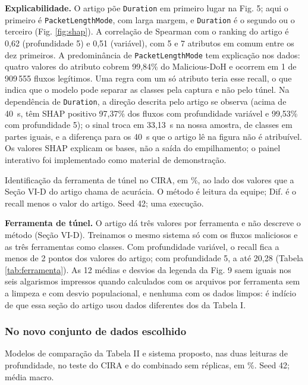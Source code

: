 \documentclass[conference]{IEEEtran}
\newcommand{\tabelacoluna}[1]{{\footnotesize\setlength{\tabcolsep}{3pt}%
  \begin{adjustbox}{max width=\columnwidth}\end{adjustbox}}}
\newcommand{\tabelapagina}[1]{{\footnotesize\setlength{\tabcolsep}{3pt}%
  \begin{adjustbox}{max width=\textwidth}\end{adjustbox}}}
\begin{document}
\textbf{Explicabilidade.} O artigo põe \texttt{Duration} em primeiro lugar na Fig. 5; aqui o primeiro é \texttt{PacketLengthMode}, com larga margem, e \texttt{Duration} é o segundo ou o terceiro (Fig. \ref{fig:shap}). A correlação de Spearman com o ranking do artigo é 0,62 (profundidade 5) e 0,51 (variável), com 5 e 7 atributos em comum entre os dez primeiros. A predominância de \texttt{PacketLengthMode} tem explicação nos dados: quatro valores do atributo cobrem 99,84\% do Malicious-DoH e ocorrem em 1 de 909\,555 fluxos legítimos. Uma regra com um só atributo teria esse recall, o que indica que o modelo pode separar as classes pela captura e não pelo túnel. Na dependência de \texttt{Duration}, a direção descrita pelo artigo se observa (acima de 40~s, têm SHAP positivo 97,37\% dos fluxos com profundidade variável e 99,53\% com profundidade 5); o sinal troca em 33,13~s na nossa amostra, de classes em partes iguais, e a diferença para os 40~s que o artigo lê na figura não é atribuível. Os valores SHAP explicam os bases, não a saída do empilhamento; o painel interativo foi implementado como material de demonstração.

\begin{table}[!t]
\centering
\caption{Identificação da ferramenta de túnel no CIRA, em \%, ao lado dos valores que a Seção VI-D do artigo chama de acurácia. O método é leitura da equipe; Dif. é o recall menos o valor do artigo. Seed 42; uma execução.}
\label{tab:ferramenta}
\tabelacoluna{ferramenta_metricas}
\end{table}

\textbf{Ferramenta de túnel.} O artigo dá três valores por ferramenta e não descreve o método (Seção VI-D). Treinamos o mesmo sistema só com os fluxos maliciosos e as três ferramentas como classes. Com profundidade variável, o recall fica a menos de 2 pontos dos valores do artigo; com profundidade 5, a até 20,28 (Tabela \ref{tab:ferramenta}). As 12 médias e desvios da legenda da Fig. 9 saem iguais nos seis algarismos impressos quando calculados com os arquivos por ferramenta sem a limpeza e com desvio populacional, e nenhuma com os dados limpos: é indício de que essa seção do artigo usou dados diferentes dos da Tabela I.

\subsubsection{No novo conjunto de dados escolhido}

\begin{table}[!t]
\centering
\caption{Modelos de comparação da Tabela II e sistema proposto, nas duas leituras de profundidade, no teste do CIRA e do combinado sem réplicas, em \%. Seed 42; média macro.}
\label{tab:segundo-modelos}
\tabelapagina{segundo_baselines_dupla}
\end{table}
\end{document}
